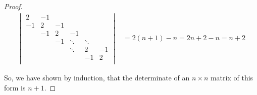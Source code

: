 \documentclass[12pt,letterpaper]{article}
\begin{document}
\begin{enumerate}
\begin{proof}
        \begin{align*}
          \begin{vmatrix}
            2  & -1 &        &        &        &        \\
            -1 & 2  & -1     &        &        &        \\
               & -1 & 2      & -1     &        &        \\
               &    & -1     & \ddots & \ddots &        \\
               &    &        & \ddots & 2      & -1     \\
               &    &        &        & -1     & 2      \\
          \end{vmatrix}
          &= 2(n + 1) - n = 2n + 2 - n = n + 2
        \end{align*}

        So, we have shown by induction, that the determinate of an $n \times n$ matrix of this form is $n + 1$.
      \end{proof}
  \end{enumerate}
\end{document}

